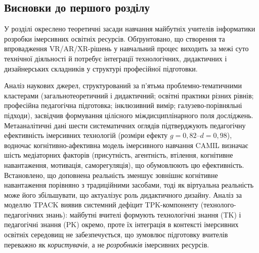 \subsection*{Висновки до першого розділу}

У розділі окреслено теоретичні засади навчання майбутніх учителів інформатики розробки імерсивних освітніх ресурсів. Обґрунтовано, що створення та впровадження VR/AR/XR-рішень у навчальний процес виходить за межі суто технічної діяльності й потребує інтеграції технологічних, дидактичних і дизайнерських складників у структурі професійної підготовки.

Аналіз наукових джерел, структурований за п'ятьма проблемно-тематичними кластерами (загальнотеоретичний і дидактичний; освітні практики різних рівнів; професійна педагогічна підготовка; інклюзивний вимір; галузево-порівняльні підходи), засвідчив формування цілісного міждисциплінарного поля досліджень. Метааналітичні дані шести систематичних оглядів підтверджують педагогічну ефективність імерсивних технологій (розміри ефекту $g=0{,}82$--$d=0{,}98$), водночас когнітивно-афективна модель імерсивного навчання CAMIL \cite{Makransky2021CAMIL} визначає шість медіаторних факторів (присутність, агентність, втілення, когнітивне навантаження, мотивація, саморегуляція), що обумовлюють цю ефективність. Встановлено, що доповнена реальність зменшує зовнішнє когнітивне навантаження порівняно з традиційними засобами, тоді як віртуальна реальність може його збільшувати, що актуалізує роль дидактичного дизайну. Аналіз за моделлю TPACK виявив системний дефіцит TPK-компоненту (технолого-педагогічних знань): майбутні вчителі формують технологічні знання (TK) і педагогічні знання (PK) окремо, проте їх інтеграція в контексті імерсивних освітніх середовищ не забезпечується, що зумовлює підготовку вчителів переважно як \emph{користувачів}, а не \emph{розробників} імерсивних ресурсів.

